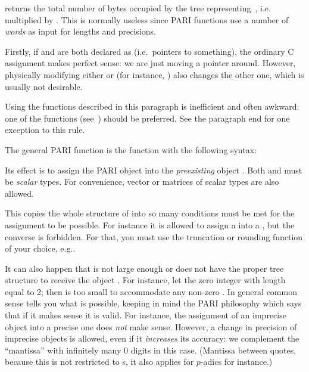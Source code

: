  returns the total number of bytes occupied
by the tree representing~, i.e.~ multiplied by
. This is normally useless since PARI functions use
a number of \emph{words} as input for lengths and precisions.

Firstly, if  and  are both declared as  (i.e.~pointers
to something), the ordinary C assignment  makes perfect sense: we
are just moving a pointer around. However, physically modifying either
 or  (for instance, ) also changes the other
one, which is usually not desirable. \label{se:assign}

 Using the functions described in this
paragraph is inefficient and often awkward: one of the 
functions (see~) should be preferred. See the paragraph
end for one exception to this rule.

\noindent
The general PARI  function is the function  with
the following syntax:


\noindent
Its effect is to assign the PARI object  into the \emph{preexisting}
object . Both  and  must be \emph{scalar} types. For
convenience, vector or matrices of scalar types are also allowed.

This copies the whole structure of  into  so many conditions
must be met for the assignment to be possible. For instance it is allowed to
assign a  into a , but the converse is forbidden. For
that, you must use the truncation or rounding function of your choice,
e.g..

It can also happen that  is not large enough or does not have the proper
tree structure to receive the object . For instance, let  the zero
integer with length equal to 2; then  is too small to accommodate any
non-zero . In general common sense tells you what is possible,
keeping in mind the PARI philosophy which says that if it makes sense it is
valid. For instance, the assignment of an imprecise object into a precise one
does \emph{not} make sense. However, a change in precision of imprecise
objects is allowed, even if it \emph{increases} its accuracy: we complement
the ``mantissa'' with infinitely many $0$ digits in this case. (Mantissa
between quotes, because this is not restricted to s, it also
applies for $p$-adics for instance.)

